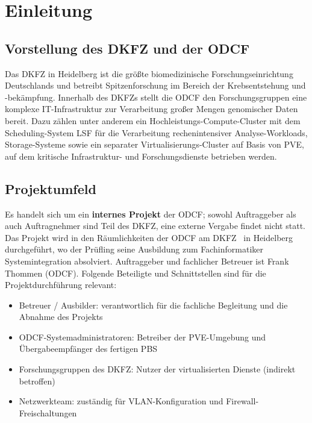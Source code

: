 \section{Einleitung}
\label{sec:Einleitung}

\subsection{Vorstellung des DKFZ und der ODCF}
\label{sec:Vorstellung_DKFZ}
Das \ac{DKFZ} in Heidelberg ist die größte
biomedizinische Forschungseinrichtung Deutschlands und betreibt
Spitzenforschung im Bereich der Krebsentstehung und -bekämpfung.
Innerhalb des DKFZs stellt die \ac{ODCF} den Forschungsgruppen eine
komplexe IT-Infrastruktur zur Verarbeitung großer Mengen genomischer
Daten bereit.
Dazu zählen unter anderem ein Hochleistungs-Compute-Cluster mit dem
Scheduling-System \ac{LSF} für die Verarbeitung rechenintensiver
Analyse-Workloads, Storage-Systeme sowie ein separater
Virtualisierungs-Cluster auf Basis von \ac{PVE}, auf dem kritische
Infrastruktur- und Forschungsdienste betrieben werden.

\subsection{Projektumfeld}
\label{sec:Projektumfeld}
Es handelt sich um ein \textbf{internes Projekt} der \ac{ODCF}; sowohl
Auftraggeber als auch Auftragnehmer sind Teil des \ac{DKFZ}, eine
externe Vergabe findet nicht statt.
Das Projekt wird in den Räumlichkeiten der \ac{ODCF} am \ac{DKFZ}~\citep{DKFZWebsite} in Heidelberg
durchgeführt, wo der Prüfling seine Ausbildung zum Fachinformatiker
Systemintegration absolviert.
Auftraggeber und fachlicher Betreuer ist Frank Thommen (\ac{ODCF}).
Folgende Beteiligte und Schnittstellen sind für die Projektdurchführung
relevant:
\begin{itemize}
    \item Betreuer / Ausbilder: verantwortlich für die fachliche Begleitung und die Abnahme des Projekts
    \item \ac{ODCF}-Systemadministratoren: Betreiber der \ac{PVE}-Umgebung und Übergabeempfänger des fertigen \ac{PBS}
    \item Forschungsgruppen des \ac{DKFZ}: Nutzer der virtualisierten Dienste (indirekt betroffen)
    \item Netzwerkteam: zuständig für \ac{VLAN}-Konfiguration und Firewall-Freischaltungen
\end{itemize}


